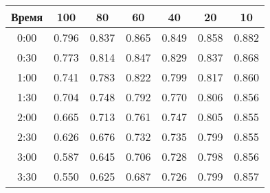 \begin{tabular}{|c|c|c|c|c|c|c|}
\hline
Время & 100   &  80   &   60  & 40   & 20   &  10  \\
\hline
0:00  & 0.796 & 0.837 & 0.865 &0.849 &0.858 &0.882 \\
0:30  & 0.773 & 0.814 & 0.847 &0.829 &0.837 &0.868 \\
1:00  & 0.741 & 0.783 & 0.822 &0.799 &0.817 &0.860 \\
1:30  & 0.704 & 0.748 & 0.792 &0.770 &0.806 &0.856 \\
2:00  & 0.665 & 0.713 & 0.761 &0.747 &0.805 &0.855 \\
2:30  & 0.626 & 0.676 & 0.732 &0.735 &0.799 &0.855 \\
3:00  & 0.587 & 0.645 & 0.706 &0.728 &0.798 &0.856 \\
3:30  & 0.550 & 0.625 & 0.687 &0.726 &0.799 &0.857 \\
\hline
\end{tabular}

